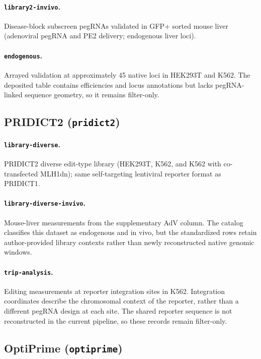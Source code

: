 \documentclass{article}
\begin{document}
\paragraph{\nolinkurl{library2-invivo}.}
Disease-block subscreen pegRNAs validated in GFP+ sorted mouse liver (adenoviral pegRNA and PE2 delivery; endogenous liver loci).

\paragraph{\nolinkurl{endogenous}.}
Arrayed validation at approximately 45 native loci in HEK293T and K562. The deposited table contains efficiencies and locus annotations but lacks pegRNA-linked sequence geometry, so it remains filter-only.

\subsection{PRIDICT2 (\texorpdfstring{\nolinkurl{pridict2}}{pridict2})}

\paragraph{\nolinkurl{library-diverse}.}
PRIDICT2 diverse edit-type library (HEK293T, K562, and K562 with co-transfected MLH1dn); same self-targeting lentiviral reporter format as PRIDICT1.

\paragraph{\nolinkurl{library-diverse-invivo}.}
Mouse-liver measurements from the supplementary AdV column. The catalog classifies this dataset as endogenous and in vivo, but the standardized rows retain author-provided library contexts rather than newly reconstructed native genomic windows.

\paragraph{\nolinkurl{trip-analysis}.}
Editing measurements at reporter integration sites in K562. Integration coordinates describe the chromosomal context of the reporter, rather than a different pegRNA design at each site. The shared reporter sequence is not reconstructed in the current pipeline, so these records remain filter-only.

\subsection{OptiPrime (\texorpdfstring{\nolinkurl{optiprime}}{optiprime})}
\end{document}
